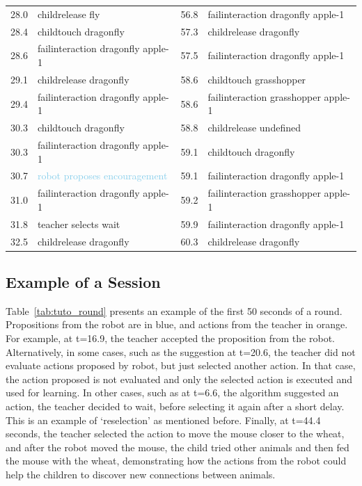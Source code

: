{\begin{table}[ht]
\begin{tabularx}{\textwidth}{@{}L{.2}L{1.8}|L{.2}L{1.8}@{}}
			28.0 & childrelease fly & 56.8 & failinteraction dragonfly apple-1\\
			28.4 & childtouch dragonfly & 57.3 & childrelease dragonfly\\
			28.6 & failinteraction dragonfly apple-1 & 57.5 & failinteraction dragonfly apple-1\\
			29.1 & childrelease dragonfly & 58.6 & childtouch grasshopper\\
			29.4 & failinteraction dragonfly apple-1 & 58.6 & failinteraction grasshopper apple-1\\
			30.3 & childtouch dragonfly & 58.8 & childrelease undefined\\
			30.3 & failinteraction dragonfly apple-1 & 59.1 & childtouch dragonfly\\
			30.7 & \textcolor{SkyBlue}{robot proposes encouragement} & 59.1 & failinteraction dragonfly apple-1\\
			31.0 & failinteraction dragonfly apple-1 & 59.2 & failinteraction grasshopper apple-1\\
			31.8 & \textcolor{BurntOrange}{teacher selects wait} & 59.9 & failinteraction dragonfly apple-1\\
			32.5 & childrelease dragonfly & 60.3 & childrelease dragonfly\\
			\bottomrule
		\end{tabularx}
	\end{table}
	\clearpage%
}

\subsection{Example of a Session}

Table~\ref{tab:tuto_round} presents an example of the first 50 seconds of a round. Propositions from the robot are in blue, and actions from the teacher in orange. For example, at t=16.9, the teacher accepted the proposition from the robot. Alternatively, in some cases, such as the suggestion at t=20.6, the teacher did not evaluate actions proposed by robot, but just selected another action. In that case, the action proposed is not evaluated and only the selected action is executed and used for learning. In other cases, such as at t=6.6, the algorithm suggested an action, the teacher decided to wait, before selecting it again after a short delay. This is an example of `reselection' as mentioned before. Finally, at t=44.4 seconds, the teacher selected the action to move the mouse closer to the wheat, and after the robot moved the mouse, the child tried other animals and then fed the mouse with the wheat, demonstrating how the actions from the robot could help the children to discover new connections between animals.

